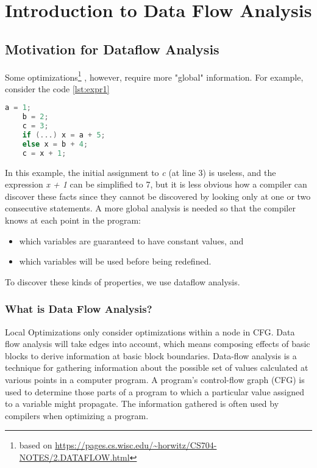 \section{Introduction to Data Flow Analysis}

\subsection{Motivation for Dataflow Analysis}

Some optimizations\footnote{based on \url{https://pages.cs.wisc.edu/~horwitz/CS704-NOTES/2.DATAFLOW.html}} , however, require more "global" information. 
For example, consider the code \ref{lst:expr1}

\begin{lstlisting}[language=C,frame=single, caption=An ,label = lst:expr1]
    a = 1;
    b = 2;
    c = 3;
    if (...) x = a + 5;
    else x = b + 4;
    c = x + 1;
\end{lstlisting}


In this example, the initial assignment to \textit{c} (at line 3) is useless, and the expression 
\textit{x + 1} can be simplified to 7, but it is less obvious how a compiler can discover these facts 
since they cannot be discovered by looking only at one or two consecutive statements. 
A more global analysis is needed so that the compiler knows at each point in the program:
\begin{itemize}
\item    which variables are guaranteed to have constant values, and
\item    which variables will be used before being redefined.
\end{itemize}

To discover these kinds of properties, we use dataflow analysis. 



\subsubsection{What is Data Flow Analysis?}

Local Optimizations only consider optimizations within a node in CFG. 
Data flow analysis will take edges into account, which means composing 
effects of basic blocks to derive information at basic block boundaries.
Data-flow analysis is a technique for gathering information about the possible 
set of values calculated at various points in a computer program. A program's 
control-flow graph (CFG) is used to determine those parts of a program to which 
a particular value assigned to a variable might propagate. The information gathered 
is often used by compilers when optimizing a program. 



